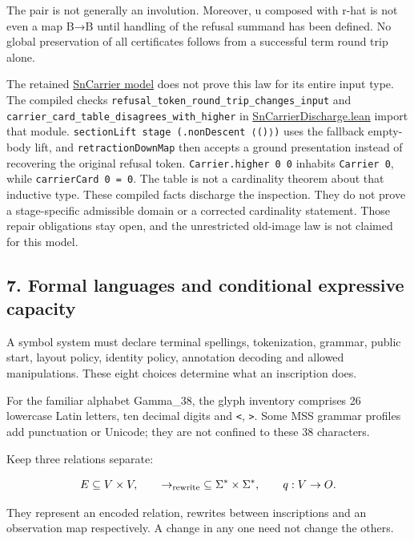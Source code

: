 \documentclass[
  11pt,
]{article}
\begin{document}
The pair is not generally an involution. Moreover, u composed with r-hat
is not even a map B→B until handling of the refusal summand has been
defined. No global preservation of all certificates follows from a
successful term round trip alone.

The retained
\href{../../../../../omega_engine_education/documentation/002_oesn/lean4/SnCarrier.lean}{SnCarrier
model} does not prove this law for its entire input type. The compiled
checks \nolinkurl{refusal_token_round_trip_changes_input} and
\nolinkurl{carrier_card_table_disagrees_with_higher} in
\href{lean4/SnCarrierDischarge.lean}{SnCarrierDischarge.lean} import
that module. \texttt{sectionLift\ stage\ (.nonDescent\ ⟨()⟩)} uses the
fallback empty-body lift, and \nolinkurl{retractionDownMap} then accepts a
ground presentation instead of recovering the original refusal token.
\texttt{Carrier.higher\ 0\ 0} inhabits \texttt{Carrier\ 0}, while
\texttt{carrierCard\ 0\ =\ 0}. The table is not a cardinality theorem
about that inductive type. These compiled facts discharge the
inspection. They do not prove a stage-specific admissible domain or a
corrected cardinality statement. Those repair obligations stay open, and
the unrestricted old-image law is not claimed for this model.

\subsection{7. Formal languages and conditional expressive
capacity}\label{formal-languages-and-conditional-expressive-capacity}

A symbol system must declare terminal spellings, tokenization, grammar,
public start, layout policy, identity policy, annotation decoding and
allowed manipulations. These eight choices determine what an inscription
does.

For the familiar alphabet Gamma\_38, the glyph inventory comprises 26
lowercase Latin letters, ten decimal digits and \texttt{\textless{}},
\texttt{\textgreater{}}. Some MSS grammar profiles add punctuation or
Unicode; they are not confined to these 38 characters.

Keep three relations separate:

\[
E\subseteq V\times V,\qquad
\to_{\rm rewrite}\;\subseteq\Sigma^*\times\Sigma^*,\qquad
q:V\to O.
\]

They represent an encoded relation, rewrites between inscriptions and an
observation map respectively. A change in any one need not change the
others.
\end{document}
